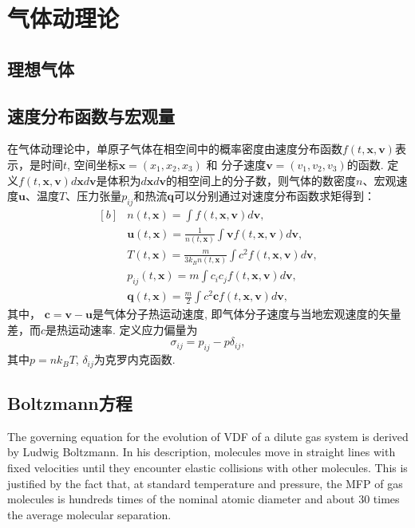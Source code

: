 
\chapter{气体动理论}


\section{理想气体}


\section{速度分布函数与宏观量}\label{sec:Boltzmann}

在气体动理论中，单原子气体在相空间中的概率密度由速度分布函数$f(t,\bm{x},\bm{v})$表示，是时间$t$, 空间坐标$ \bm{x}=(x_1,x_2,x_3)$ 和 分子速度$\bm{v}=(v_1,v_2,v_3)$的函数. 定义$f(t,\bm{x},\bm{v})d\bm{x}d\bm{v}$是体积为$d\bm{x}d\bm{v}$的相空间上的分子数，则气体的数密度$n$、宏观速度$\bm{u}$、温度$T$、压力张量$p_{ij}$和热流$\bm{q}$可以分别通过对速度分布函数求矩得到：
\begin{equation}\label{macroscopic_origin}
\begin{aligned}[b]
&n(t,\bm{x})=\int{}f(t,\bm{x},\bm{v})d\bm{v}, \\  &\bm{u}(t,\bm{x})=\frac{1}{n(t,\bm{x})}\int\bm{v}f(t,\bm{x},\bm{v})d\bm{v},\\   &T(t,\bm{x})=\frac{m}{3k_Bn(t,\bm{x})}\int{}c^2f(t,\bm{x},\bm{v})d\bm{v}, \\    &p_{ij}(t,\bm{x})={}m\int{}c_ic_jf(t,\bm{x},\bm{v})d\bm{v}, \\  &\bm{q}(t,\bm{x})=\frac{m}{2}\int{}c^2\bm{c}f(t,\bm{x},\bm{v})d\bm{v},
\end{aligned}
\end{equation}
其中， $\bm{c}=\bm{v}-\bm{u}$是气体分子热运动速度, 即气体分子速度与当地宏观速度的矢量差，而$c$是热运动速率. 定义应力偏量为
\begin{equation}
\sigma_{ij}=p_{ij}-p\delta_{ij},
\end{equation}
其中$p=nk_BT$, $\delta_{ij}$为克罗内克函数. 


\section{Boltzmann方程}

The governing equation for the evolution of VDF of a dilute gas system is derived by Ludwig Boltzmann. In his description, molecules move in straight lines with fixed velocities until they encounter elastic collisions with other molecules. This is justified by the fact that, at standard temperature and pressure, the MFP of gas molecules is hundreds times of the nominal atomic diameter and about 30 times the average molecular separation.  

